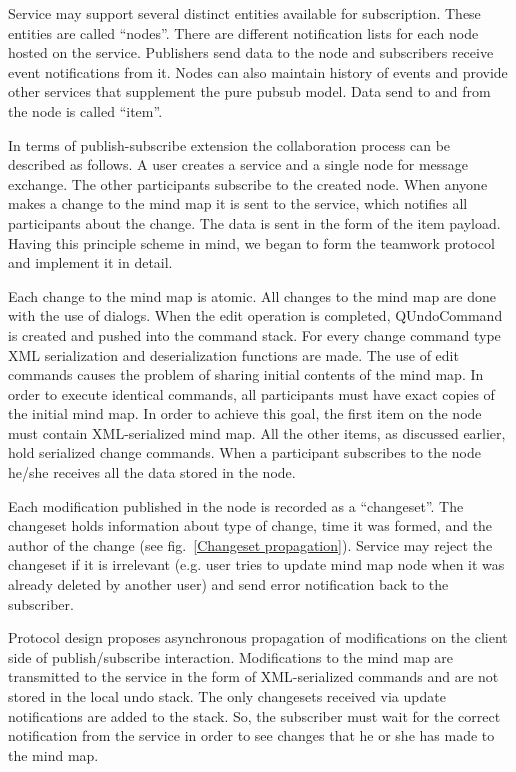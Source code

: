 Service may support several distinct entities available for subscription. These
entities are called ``nodes''. There are different notification lists for each
node hosted on the service. Publishers send data to the node and subscribers
receive event notifications from it. Nodes can also maintain history of events
and provide other services that supplement the pure pubsub model. Data send to
and from the node is called ``item''.

In terms of publish-subscribe extension the collaboration process can be
described as follows. A user creates a service and a single node for message
exchange. The other participants subscribe to the created node. When anyone
makes a change to the mind map it is sent to the service, which notifies all
participants about the change. The data is sent in the form of the item
payload. Having this principle scheme in mind, we began to form the teamwork
protocol and implement it in detail.

Each change to the mind map is atomic. All changes to the mind map are done with
the use of dialogs. When the edit operation is completed, QUndoCommand is
created and pushed into the command stack. For every change command type XML
serialization and deserialization functions are made.  The use of edit commands
causes the problem of sharing initial contents of the mind map. In order to
execute identical commands, all participants must have exact copies of the
initial mind map. In order to achieve this goal, the first item on the node must
contain XML-serialized mind map. All the other items, as discussed earlier, hold
serialized change commands.  When a participant subscribes to the node he/she
receives all the data stored in the node.


Each modification published in the node is recorded as a ``changeset''. The
changeset holds information about type of change, time it was formed, and the
author of the change (see fig.~\ref{Changeset propagation}). Service may reject
the changeset if it is irrelevant (e.g. user tries to update mind map node when
it was already deleted by another user) and send error notification back to the
subscriber.

Protocol design proposes asynchronous propagation of modifications on the client
side of publish/subscribe interaction. Modifications to the mind map are
transmitted to the service in the form of XML-serialized commands and are not
stored in the local undo stack. The only changesets received via update
notifications are added to the stack. So, the subscriber must wait for the
correct notification from the service in order to see changes that he or she has
made to the mind map.

